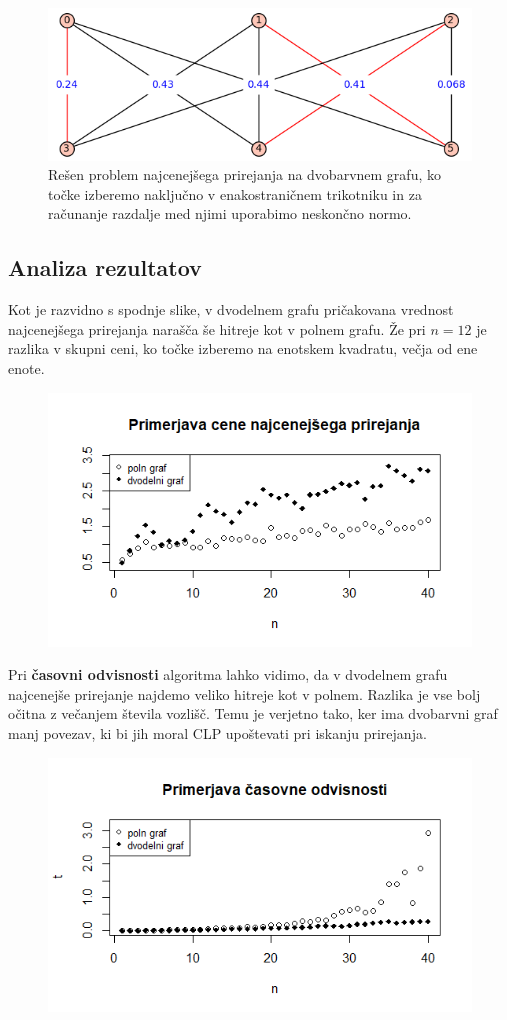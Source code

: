 \documentclass[a4paper, 11pt]{article}
\begin{document}
\begin{figure}[!htb]
    \includegraphics[scale=0.5]{dvobarvenclp}
    \centering
    \caption{Rešen problem najcenejšega prirejanja na dvobarvnem grafu, ko točke izberemo naključno v enakostraničnem trikotniku in za računanje razdalje med njimi uporabimo neskončno normo.}
    \label{fig:dvobarvenclp}
\end{figure}

\subsection{Analiza rezultatov}
Kot je razvidno s spodnje slike, v dvodelnem grafu pričakovana vrednost najcenejšega prirejanja narašča še hitreje kot v polnem grafu.
Že pri $n=12$ je razlika v skupni ceni, ko točke izberemo na enotskem kvadratu, večja od ene enote.
\begin{figure}[!htb]
    \includegraphics[scale=0.5]{primerjava_cene_polni_dvodelni}
    \centering
\end{figure}

Pri \textbf{časovni odvisnosti} algoritma lahko vidimo, da v dvodelnem grafu najcenejše prirejanje najdemo veliko hitreje kot v polnem.
Razlika je vse bolj očitna z večanjem števila vozlišč. 
Temu je verjetno tako, ker ima dvobarvni graf manj povezav, ki bi jih moral CLP upoštevati pri iskanju prirejanja.

\begin{figure}[!htb]
    \includegraphics[scale=0.65]{primerjava_cas_polni_dvodelni}
    \centering
\end{figure}
\end{document}
